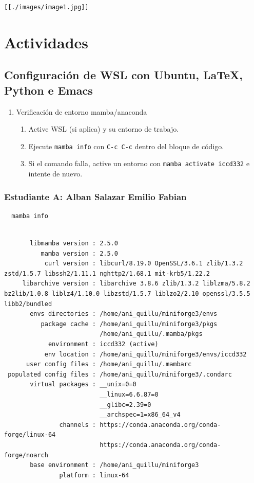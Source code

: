\documentclass{article}
\begin{document}
\begin{verbatim}
[[./images/image1.jpg]]
\end{verbatim}
\section{Actividades}
\label{sec:org4415cd4}
\subsection{Configuración de WSL con Ubuntu, \LaTeX, Python e Emacs}
\label{sec:orgacd2cdd}

\begin{enumerate}
\item Verificación de entorno mamba/anaconda
\begin{enumerate}
\item Active WSL (si aplica) y su entorno de trabajo.
\item Ejecute \texttt{mamba info} con \texttt{C-c C-c} dentro del bloque de código.
\item Si el comando falla, active un entorno con \texttt{mamba activate iccd332} e intente de nuevo.
\end{enumerate}
\end{enumerate}
\subsubsection{Estudiante A: Alban Salazar Emilio Fabian}
\label{sec:org4527fe9}
\begin{verbatim}
  mamba info
\end{verbatim}
\begin{verbatim}

       libmamba version : 2.5.0
          mamba version : 2.5.0
           curl version : libcurl/8.19.0 OpenSSL/3.6.1 zlib/1.3.2 zstd/1.5.7 libssh2/1.11.1 nghttp2/1.68.1 mit-krb5/1.22.2
     libarchive version : libarchive 3.8.6 zlib/1.3.2 liblzma/5.8.2 bz2lib/1.0.8 liblz4/1.10.0 libzstd/1.5.7 liblzo2/2.10 openssl/3.5.5 libb2/bundled
       envs directories : /home/ani_quillu/miniforge3/envs
          package cache : /home/ani_quillu/miniforge3/pkgs
                          /home/ani_quillu/.mamba/pkgs
            environment : iccd332 (active)
           env location : /home/ani_quillu/miniforge3/envs/iccd332
      user config files : /home/ani_quillu/.mambarc
 populated config files : /home/ani_quillu/miniforge3/.condarc
       virtual packages : __unix=0=0
                          __linux=6.6.87=0
                          __glibc=2.39=0
                          __archspec=1=x86_64_v4
               channels : https://conda.anaconda.org/conda-forge/linux-64
                          https://conda.anaconda.org/conda-forge/noarch
       base environment : /home/ani_quillu/miniforge3
               platform : linux-64
\end{verbatim}
\end{document}
